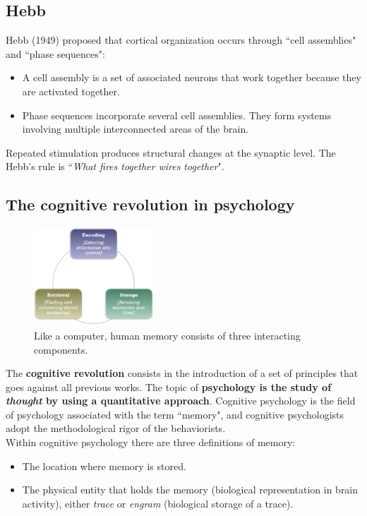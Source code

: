 
\subsection{Hebb}
Hebb (1949) proposed that cortical organization occurs through ``cell assemblies" and ``phase sequences":
\begin{itemize}
    \item A cell assembly is a set of associated neurons that work together because they are activated together.
    \item Phase sequences incorporate several cell assemblies. They form systems involving multiple interconnected areas of the brain.
\end{itemize}
Repeated stimulation produces structural changes at the synaptic level. The Hebb's rule is ``\textit{What fires together wires together}".

\subsection{The cognitive revolution in psychology}
\begin{figure}
  \centering
  \includegraphics[width=0.4\textwidth]{images/metaphor.png}
  \caption{Like a computer, human memory consists of three interacting components.}
  \label{fig:metaphor}
\end{figure}
The \textbf{cognitive revolution} consists in the introduction of a set of principles that goes against all previous works.
The topic of \textbf{psychology is the study of \textit{thought} by using a quantitative approach}.
Cognitive psychology is the field of psychology associated with the term ``memory", and cognitive psychologists adopt the methodological rigor of the behaviorists.\\

Within cognitive psychology there are three definitions of memory:
\begin{itemize}
    \item The location where memory is stored.
    \item The physical entity that holds the memory (biological representation in brain activity), either \textit{trace} or \textit{engram} (biological storage of a trace).
\end{itemize}

